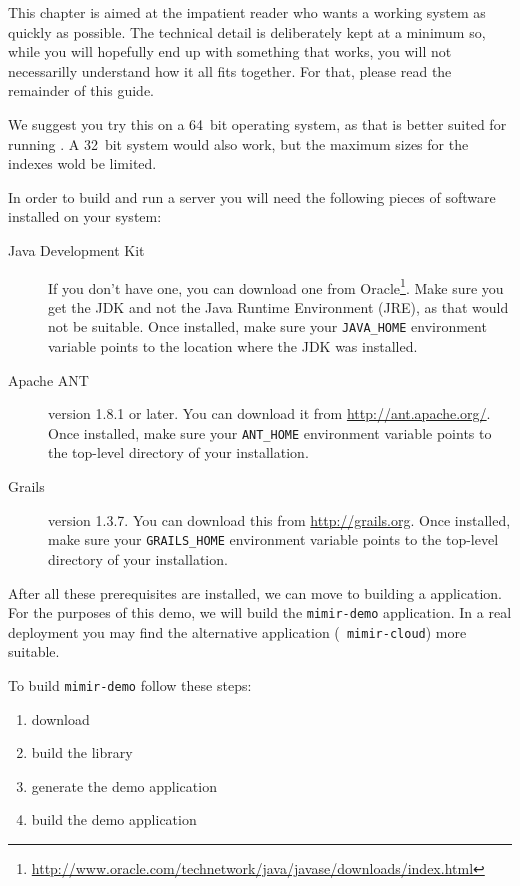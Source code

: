 This chapter is aimed at the impatient reader who wants a working system as
quickly as possible. The technical detail is deliberately kept at a minimum so,
while you will hopefully end up with something that works, you will not
necessarilly understand how it all fits together. For that, please read the
remainder of this guide.

We suggest you try this on a 64~bit operating system, as that is better suited
for running \Mimir{}. A 32~bit system would also work, but the maximum sizes for
the indexes wold be limited.

In order to build and run a \Mimir{} server you will need the following pieces
of software installed on your system:
\begin{description}
  \item[Java Development Kit] If you don't have one, you can download one from
  Oracle\footnote{\url{http://www.oracle.com/technetwork/java/javase/downloads/index.html}}.
  Make sure you get the JDK and not the Java Runtime Environment (JRE), as that
  would not be suitable. Once installed, make sure your \verb!JAVA_HOME!
  environment variable points to the location where the JDK was installed. 
  \item[Apache ANT] version 1.8.1 or later. You can download it from
  \url{http://ant.apache.org/}. Once installed, make sure your \verb!ANT_HOME!
  environment variable points to the top-level directory of your installation.
  \item[Grails] version 1.3.7. You can download this from
  \url{http://grails.org}. Once installed, make sure your \verb!GRAILS_HOME!
  environment variable points to the top-level directory of your installation. 
\end{description}

After all these prerequisites are installed, we can move to building a \Mimir{}
application. For the purposes of this demo, we will build the {\tt mimir-demo}
application. In a real deployment you may find the alternative application ({\tt
mimir-cloud}) more suitable.

To build {\tt mimir-demo} follow these steps:
\begin{enumerate}
  \item download \Mimir{}
  \item build the library
  \item generate the demo application
  \item build the demo application
\end{enumerate}


